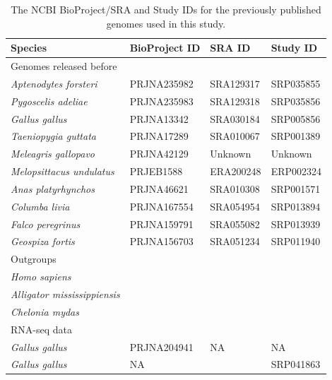 \documentclass[10pt]{bmc_article}
\newenvironment{bmcformat}{\begin{raggedright}\baselineskip20pt\sloppy\setboolean{publ}{false}}{\end{raggedright}\baselineskip20pt\sloppy}
\begin{document}
\begin{bmcformat}
\begin{table}[h!]
  \begin{center}
    \begin{tabular}{|l|l|l|l|}
    \hline
Species & BioProject ID & SRA ID & Study ID \\
    \hline
\multicolumn{4}{|l|}{Genomes released before}\\
\hline
\emph{Aptenodytes forsteri} & PRJNA235982 & SRA129317 & SRP035855\\
\emph{Pygoscelis adeliae} & PRJNA235983 & SRA129318 & SRP035856\\
\emph{Gallus gallus} & PRJNA13342 & SRA030184 & SRP005856\\
\emph{Taeniopygia guttata} & PRJNA17289 & SRA010067 & SRP001389\\
\emph{Meleagris gallopavo} & PRJNA42129 & Unknown & Unknown\\
\emph{Melopsittacus undulatus} & PRJEB1588 & ERA200248 & ERP002324\\
\emph{Anas platyrhynchos} & PRJNA46621 & SRA010308 & SRP001571\\
\emph{Columba livia} & PRJNA167554 & SRA054954 & SRP013894\\
\emph{Falco peregrinus} & PRJNA159791 & SRA055082 & SRP013939\\
\emph{Geospiza fortis} & PRJNA156703 & SRA051234 & SRP011940\\
\hline
\multicolumn{4}{|l|}{Outgroups}\\
\hline
\emph{Homo sapiens} & & & \\
\emph{Alligator mississippiensis} & & & \\
\emph{Chelonia mydas} & & & \\
\hline
\multicolumn{4}{|l|}{RNA-seq data}\\
\hline
\emph{Gallus gallus} & PRJNA204941 & NA & NA \\
\emph{Gallus gallus} & NA & & SRP041863 \\
\hline
    \end{tabular}
  \end{center}
  \caption{The NCBI BioProject/SRA and Study IDs for the previously
    published genomes used in this study.}
\end{table}


{
  } %



\end{bmcformat}
\end{document}
